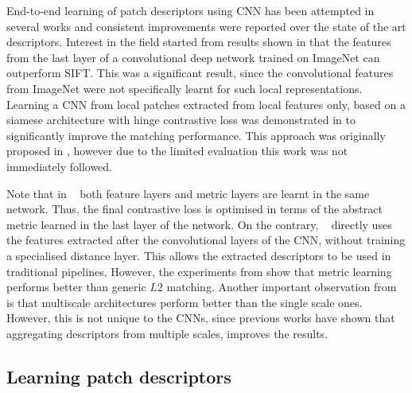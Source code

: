 End-to-end learning of patch descriptors using CNN has been attempted
in several works
\cite{FDB14,ZagoruykoCVPR2015,simo2015deepdesc,Han_2015_CVPR} and
consistent improvements were reported over the state of the art
descriptors.  Interest in the field started from results shown in
\cite{FDB14} that the features from the last layer of a convolutional
deep network trained on ImageNet \cite{ILSVRC15} can outperform
SIFT. This was a significant result, since the convolutional features
from ImageNet were not specifically learnt for such local
representations. Learning a CNN from local patches extracted from
local features only, based on a siamese architecture with hinge
contrastive loss \cite{1640964} was demonstrated in
\cite{ZagoruykoCVPR2015,simo2015deepdesc,Han_2015_CVPR} to significantly
 improve the matching performance. This approach was originally proposed in \cite{Jahrer}, however due to the limited evaluation this work was
not immediately followed.

Note that in ~\cite{ZagoruykoCVPR2015,Han_2015_CVPR} both feature
layers and metric layers are learnt in the same network. Thus, the
final contrastive loss is optimised in terms of the abstract metric
learned in the last layer of the network. On the contrary,
~\cite{simo2015deepdesc} directly uses the features extracted after
the convolutional layers of the CNN, without training a specialised
distance layer. This allows the extracted descriptors to be used in
traditional pipelines. However, the experiments from
\cite{ZagoruykoCVPR2015} show that metric learning performs better
than generic $L2$ matching. Another important observation from \cite{ZagoruykoCVPR2015} is that
multiscale architectures perform better than the single scale ones. However, this is not unique to the CNNs, since previous works have
shown that aggregating descriptors from multiple scales, improves the results.

\subsection{Learning patch descriptors}

